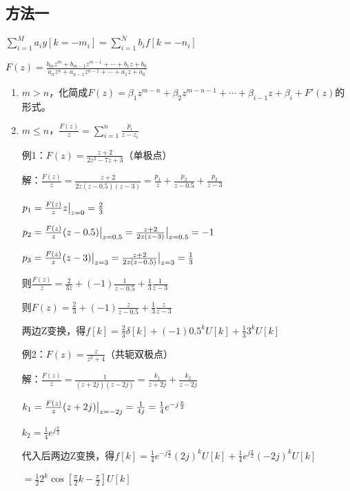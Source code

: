 \documentclass[UTF8]{ctexart}
\begin{document}
\subsection{方法一}
$\sum_{i=1}^{M}a_iy[k=-m_i]=\sum_{i=1}^{N}b_if[k=-n_i]$ \par
$F(z)=\frac{b_mz^m+b_{m-1}z^{m-1}+\cdots+b_1z+b_0}{a_nz^n+a_{n-1}z^{n-1}+\cdots+a_1z+a_0}$
\begin{enumerate}[label=(\arabic*),itemindent=0pt,labelindent=\parindent,labelwidth=2em,labelsep=5pt,leftmargin=*]
  \item $m>n$，化简成$F(z)=\beta_1z^{m-n}+\beta_2z^{m-n-1}+\cdots+\beta_{i-1}z+\beta_i+F'(z)$的形式。
  \item $m\leqslant n$，$\frac{F(z)}{z}=\sum_{i=1}^{n}\frac{p_i}{z-z_i}$ \par
        例1：$F(z)=\frac{z+2}{2z^2-7z+3}$（单极点）\par
        \qquad 解：$\frac{F(z)}{z}=\frac{z+2}{2z(z-0.5)(z-3)}=\frac{p_1}{z}+\frac{p_2}{z-0.5}+\frac{p_3}{z-3}$ \par
        \qquad \qquad $p_1=\frac{F(z)}{z}z\big{|}_{z=0}=\frac{2}{3}$ \par
        \qquad \qquad $p_2=\frac{F(z)}{z}(z-0.5)\big{|}_{z=0.5}=\frac{z+2}{2z(z-3)}\big{|}_{z=0.5}=-1$ \par
        \qquad \qquad $p_3=\frac{F(z)}{z}(z-3)\big{|}_{z=3}=\frac{z+2}{2z(z-0.5)}\big{|}_{z=3}=\frac{1}{3}$ \par
        \qquad \qquad 则$\frac{F(z)}{z}=\frac{2}{3z}+(-1)\frac{1}{z-0.5}+\frac{1}{3}\frac{1}{z-3}$ \par
        \qquad \qquad 则$F(z)=\frac{2}{3}+(-1)\frac{z}{z-0.5}+\frac{1}{3}\frac{z}{z-3}$ \par
        \qquad \qquad 两边Z变换，得$f[k]=\frac{2}{3}\delta[k]+(-1)0.5^kU[k]+\frac{1}{3}3^kU[k]$ \par
        例2：$F(z)=\frac{z}{z^2+4}$（共轭双极点）\par
        \qquad 解：$\frac{F(z)}{z}=\frac{1}{(z+2j)(z-2j)}=\frac{k_1}{z+2j}+\frac{k_2}{z-2j}$ \par
        \qquad \qquad $k_1=\frac{F(z)}{z}(z+2j)\big{|}_{z=-2j}=\frac{1}{4j}=\frac{1}{4}e^{-j\frac{\pi}{2}}$ \par
        \qquad \qquad $k_2=\frac{1}{4}e^{j\frac{\pi}{2}}$ \par
        \qquad \qquad 代入后两边Z变换，得$f[k]=\frac{1}{4}e^{-j\frac{\pi}{2}}(2j)^kU[k]+\frac{1}{4}e^{j\frac{\pi}{2}}(-2j)^kU[k]$ \par
        \qquad \qquad \qquad \qquad \qquad \qquad \qquad \qquad \quad $=\frac{1}{2}2^k\cos[\frac{\pi}{2}k-\frac{\pi}{2}]U[k]$ \par

\end{enumerate}
\end{document}
